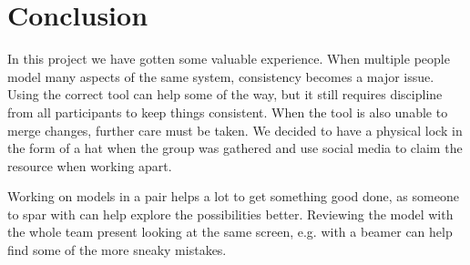 \chapter{Conclusion}
In this project we have gotten some valuable experience. When multiple people model many aspects of the same system, consistency becomes a major issue. Using the correct tool can help some of the way, but it still requires discipline from all participants to keep things consistent. When the tool is also unable to merge changes, further care must be taken. We decided to have a physical lock in the form of a hat when the group was gathered and use social media to claim the resource when working apart.

Working on models in a pair helps a lot to get something good done, as someone to spar with can help explore the possibilities better. Reviewing the model with the whole team present looking at the same screen, e.g. with a beamer can help find some of the more sneaky mistakes.


